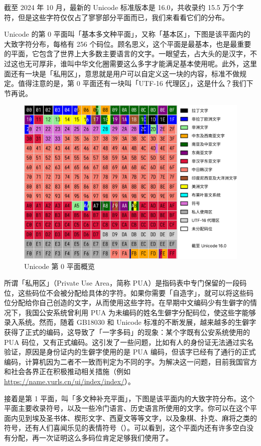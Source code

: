 截至 2024 年 10 月，最新的 Unicode 标准版本是 16.0，共收录约 15.5 万个字符，但是这些字符仅仅占了寥寥部分平面而已，我们来看看它们的分布。

Unicode 的第 0 平面叫「基本多文种平面」，又称「基本区」，下图是该平面内的大致字符分布，每格有 256 个码位。顾名思义，这个平面是最基本，也是最重要的平面，它包含了世界上大多数主要语言的文字。一眼望去，占大头的是汉字，不过这也无可厚非，谁叫中华文化圈需要这么多字才能满足基本使用呢。此外，这里面还有一块是「私用区」，意思就是用户可以自定义这一块的内容，标准不做规定。值得注意的是，第 0 平面还有一块叫「UTF-16 代理区」，这是什么？我们下节再说。

\begin{figure}[htb!]
  \centering
  \includegraphics[width=.7\textwidth]{assets/advanced/UnicodeBMP.pdf}
  \caption{Unicode 第 0 平面概览}
  \label{fig:UnicodeBMP}
\end{figure}

\begin{note}
  所谓「私用区」（Private Use Area，简称 PUA）是指码表中专门保留的一段码位，这些码位不会被分配给具体的字符。如果你需要「自造字」，就可以将这些码位分配给你自己创造的文字，从而使用这些字符。在早期中文编码少有生僻字的情况下，我国公安系统曾利用 PUA 为未编码的姓名生僻字分配码位，使这些字能够录入系统。然而，随着 GB18030 和 Unicode 标准的不断发展，越来越多的生僻字获得了正式的编码，这导致了「一字多码」的现象：某个字既有公安系统使用的 PUA 码位，又有正式编码。这引发了一些问题，比如有人的身份证无法通过实名验证，原因是身份证内的生僻字使用的是 PUA 编码，但该字已经有了通行的正式编码，计算机因为二者不一致而判定为不同的字。为解决这一问题，目前我国官方和社会各界正在积极推动相关措施（例如 \url{https://name.vurls.cn/ui/index/index/}）。
\end{note}

接着是第 1 平面，叫「多文种补充平面」，下图是该平面内的大致字符分布。这个平面主要收录符号，以及一些冷门语言、历史语言所使用的文字。你可以在这个平面内见到埃及圣书体、楔形文字、西夏文等等文字，以及象棋、扑克、麻将之类的符号，还有人们喜闻乐见的表情符号（）。可以看到，这个平面内还有许多空白没有分配，再一次证明这么多码位肯定足够我们使用了。

